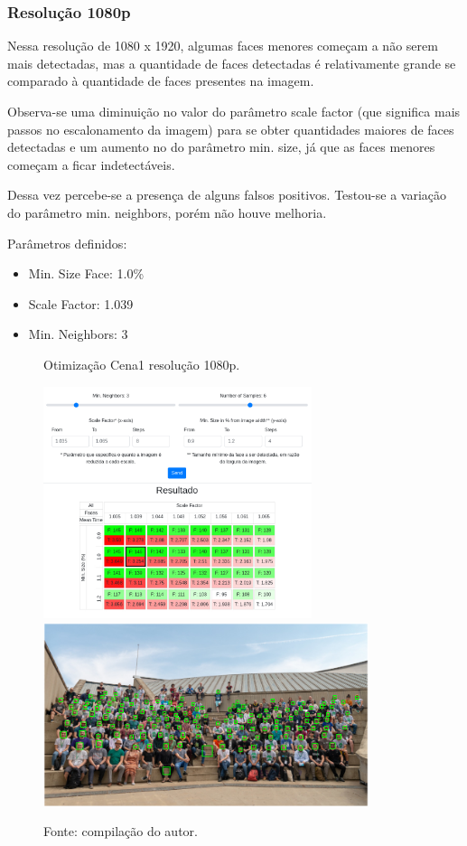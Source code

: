 \subsubsection{Resolução 1080p} \label{sssec:resolution1-2}

Nessa resolução de 1080 x 1920, algumas faces menores começam a não serem mais detectadas, mas a quantidade de faces detectadas é relativamente grande se comparado à quantidade de faces presentes na imagem.

Observa-se uma diminuição no valor do parâmetro scale factor (que significa mais passos no escalonamento da imagem) para se obter quantidades maiores de faces detectadas e um aumento no do parâmetro min. size, já que as faces menores começam a ficar indetectáveis.

Dessa vez percebe-se a presença de alguns falsos positivos. Testou-se a variação do parâmetro min. neighbors, porém não houve melhoria.

Parâmetros definidos: 
\begin{itemize}
    \SingleSpacing
    \item Min. Size Face: 1.0\%
    \item Scale Factor: 1.039
    \item Min. Neighbors: 3
\end{itemize}

\begin{figure}[H]
    \centering
    \caption[Otimização Cena 1 - resolução 1080p.]{Otimização Cena1 resolução 1080p.}
    \includegraphics[width=0.70\textwidth]{Cap4_Experimentos_Realizados/Figures/cena1_param_1080p_matriz.jpg}
    \includegraphics[width=0.85\textwidth]{Cap4_Experimentos_Realizados/Figures/cena1_param_1080p_faces.jpg}
    \caption*{Fonte: compilação do autor.\footnotemark[\value{footnote}]}
    \label{fig:otimizacaoCena1_1080p}
\end{figure}

